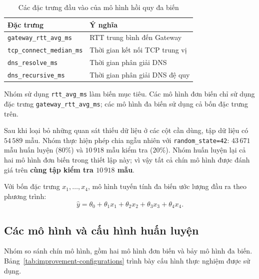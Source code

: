 \begin{table}[H]
    \centering
    \caption{Các đặc trưng đầu vào của mô hình hồi quy đa biến}
    \label{tab:improvement-features}
    \small
    \begin{tabular}{p{}p{}}
        \toprule
        \textbf{Đặc trưng} & \textbf{Ý nghĩa} \\
        \midrule
        \texttt{gateway\_rtt\_avg\_ms} & RTT trung bình đến Gateway \\
        \texttt{tcp\_connect\_median\_ms} & Thời gian kết nối TCP trung vị \\
        \texttt{dns\_resolve\_ms} & Thời gian phân giải DNS \\
        \texttt{dns\_recursive\_ms} & Thời gian phân giải DNS đệ quy \\
        \bottomrule
    \end{tabular}
\end{table}

Nhóm sử dụng \texttt{rtt\_avg\_ms} làm biến mục tiêu.
Các mô hình đơn biến chỉ sử dụng đặc trưng
\texttt{gateway\_rtt\_avg\_ms}; các mô hình đa biến
sử dụng cả bốn đặc trưng trên.

Sau khi loại bỏ những quan sát thiếu dữ liệu ở các cột cần dùng,
tập dữ liệu có $54\,589$ mẫu. Nhóm thực hiện phép chia ngẫu nhiên
với \texttt{random\_state=42}: $43\,671$ mẫu huấn luyện ($80\%$)
và $10\,918$ mẫu kiểm tra ($20\%$). Nhóm huấn luyện lại cả hai
mô hình đơn biến trong thiết lập này; vì vậy tất cả chín mô hình
được đánh giá trên \textbf{cùng tập kiểm tra $10\,918$ mẫu}.

Với bốn đặc trưng $x_1,\ldots,x_4$, mô hình tuyến tính đa biến
ước lượng đầu ra theo phương trình:
\[
    \hat{y} = \theta_0 + \theta_1x_1 + \theta_2x_2
    + \theta_3x_3 + \theta_4x_4.
\]

\subsection{Các mô hình và cấu hình huấn luyện}

Nhóm so sánh chín mô hình, gồm hai mô hình đơn biến và bảy
mô hình đa biến. Bảng~\ref{tab:improvement-configurations}
trình bày cấu hình thực nghiệm được sử dụng.

